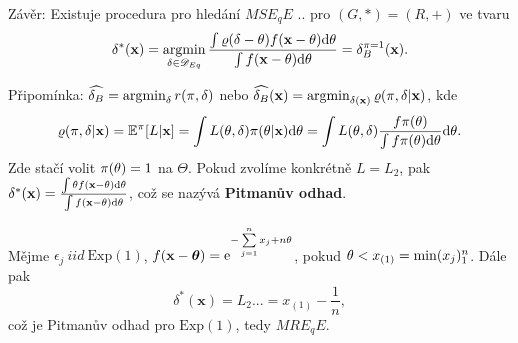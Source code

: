 Závěr: Existuje procedura pro hledání $MSE_qE$ .. pro $(G,\ast)=(R,+)$ ve tvaru
$$ \delta^\ast(\textbf{x})=\mathop{\mathrm{argmin}}_{\delta\in\mathscr{D}_{Eq}}\frac{\int\varrho(\delta-\theta)f(\textbf{x}-\theta)\mathrm{d}\theta}{\int f(\textbf{x}-\theta)\mathrm{d}\theta}=\delta_B^{\pi=1}(\textbf{x}).$$

\begin{remark}
	Připomínka: $\widehat{\delta_B}=\mathop{\mathrm{argmin}}_\delta r(\pi,\delta)$ nebo $\widehat{\delta_B}(\textbf{x})=\mathop{\mathrm{argmin}}_{\delta(\textbf{x})}\varrho(\pi,\delta|\textbf{x})$, kde 
	$$ \varrho(\pi,\delta|\textbf{x})=\mathbb{E}^\pi[L|\textbf{x}]=\int L(\theta,\delta)\pi(\theta|\textbf{x})\mathrm{d}\theta=\int L(\theta,\delta)\frac{f \pi(\theta)}{\int f \pi(\theta)\mathrm{d}\theta}\mathrm{d}\theta.$$
 Zde stačí volit $\pi(\theta)=1$ na $\Theta$. Pokud zvolíme konkrétně $L=L_2$, pak $\delta^\ast(\textbf{x})=\frac{\int\theta f(\textbf{x}-\theta)\mathrm{d}\theta}{\int f(\textbf{x}-\theta)\mathrm{d}\theta}$, což se nazývá \textbf{Pitmanův odhad}.
\end{remark}
\begin{example}
	Mějme $\epsilon_j~iid~\mathrm{Exp}(1)$, $f(\textbf{x}-\boldsymbol{\theta})=\mathrm{e}^{-\sum\limits_{j=1}^{n} x_j+n\theta}$, pokud $\theta< x_{(1)}=\min (x_j)_1^n$. Dále pak
	$$ \delta^\ast(\textbf{x})\equal{L_2}...=x_{(1)}-\frac{1}{n},$$ což je Pitmanův odhad pro $\mathrm{Exp}(1)$, tedy $MRE_qE$.
\end{example}